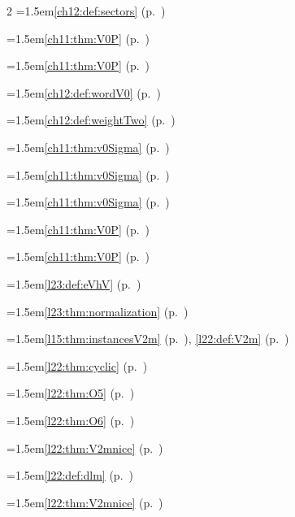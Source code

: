 \begin{multicols}{2}
\hangindent=1.5em\quad \ref{ch12:def:sectors} (p.~\pageref{ch12:def:sectors})\par
\hangindent=1.5em\quad \ref{ch11:thm:V0P} (p.~\pageref{ch11:thm:V0P})\par
\hangindent=1.5em\quad \ref{ch11:thm:V0P} (p.~\pageref{ch11:thm:V0P})\par
\hangindent=1.5em\quad \ref{ch12:def:wordV0} (p.~\pageref{ch12:def:wordV0})\par
\hangindent=1.5em\quad \ref{ch12:def:weightTwo} (p.~\pageref{ch12:def:weightTwo})\par
\hangindent=1.5em\quad \ref{ch11:thm:v0Sigma} (p.~\pageref{ch11:thm:v0Sigma})\par
\hangindent=1.5em\quad \ref{ch11:thm:v0Sigma} (p.~\pageref{ch11:thm:v0Sigma})\par
\hangindent=1.5em\quad \ref{ch11:thm:v0Sigma} (p.~\pageref{ch11:thm:v0Sigma})\par
\hangindent=1.5em\quad \ref{ch11:thm:V0P} (p.~\pageref{ch11:thm:V0P})\par
\hangindent=1.5em\quad \ref{ch11:thm:V0P} (p.~\pageref{ch11:thm:V0P})\par
\hangindent=1.5em\quad \ref{l23:def:eVhV} (p.~\pageref{l23:def:eVhV})\par
\hangindent=1.5em\quad \ref{l23:thm:normalization} (p.~\pageref{l23:thm:normalization})\par
\hangindent=1.5em\quad \ref{l15:thm:instancesV2m} (p.~\pageref{l15:thm:instancesV2m}), \ref{l22:def:V2m} (p.~\pageref{l22:def:V2m})\par
\hangindent=1.5em\quad \ref{l22:thm:cyclic} (p.~\pageref{l22:thm:cyclic})\par
\hangindent=1.5em\quad \ref{l22:thm:O5} (p.~\pageref{l22:thm:O5})\par
\hangindent=1.5em\quad \ref{l22:thm:O6} (p.~\pageref{l22:thm:O6})\par
\hangindent=1.5em\quad \ref{l22:thm:V2mnice} (p.~\pageref{l22:thm:V2mnice})\par
\hangindent=1.5em\quad \ref{l22:def:dlm} (p.~\pageref{l22:def:dlm})\par
\hangindent=1.5em\quad \ref{l22:thm:V2mnice} (p.~\pageref{l22:thm:V2mnice})\par

\end{multicols}
